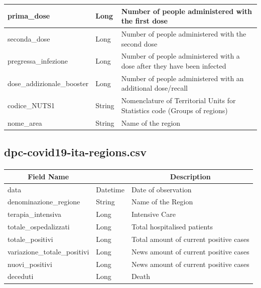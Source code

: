 \documentclass[a4paper,12pt]{article}
\begin{document}
\begin{center}
\begin{tabular}{|m{45mm}|>{\raggedright}m{16mm}|m{75mm}|}
\hline
prima\_dose & Long & Number of people administered with the first dose \\
\hline
seconda\_dose & Long & Number of people administered with the second dose \\
\hline
pregressa\_infezione & Long & Number of people administered with a dose after they have
been infected \\
\hline
dose\_addizionale\_booster & Long & Number of people administered with an additional dose/recall \\
\hline
codice\_NUTS1 & String & Nomenclature of Territorial Units for Statistics code (Groups of regions) \\
\hline
nome\_area & String & Name of the region \\
\hline
\end{tabular}
\end{center}

\subsection{dpc-covid19-ita-regions.csv}
\paragraph{}
\begin{center}
\begin{tabular}{|m{45mm}|>{\raggedright}m{16mm}|m{75mm}|}
\hline
\multicolumn{1}{|c|}{\textbf{ Field Name }}
& \multicolumn{1}{c|}{\textbf{ Data Type }} 
    	& \multicolumn{1}{c|}{\textbf{ Description }}\\
\hline
data & Datetime & Date of observation \\
\hline
denominazione\_regione & String & Name of the Region \\
\hline
terapia\_intensiva & Long & Intensive Care \\
\hline
totale\_ospedalizzati & Long & Total hospitalised patients \\
\hline
totale\_positivi & Long & Total amount of current positive cases \\
\hline
variazione\_totale\_positivi & Long & News amount of current positive cases \\
\hline
nuovi\_positivi & Long & News amount of current positive cases \\
\hline
deceduti & Long & Death \\
\hline
\end{tabular}
\end{center}
\end{document}
